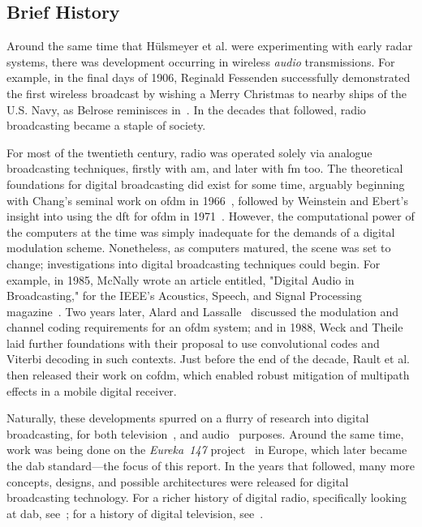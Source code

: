 \documentclass[class=report,11pt,crop=false]{standalone}
\begin{document}
\subsection{Brief History}
Around the same time that H\"ulsmeyer et al. were experimenting with early radar systems, there was development occurring in wireless \emph{audio} transmissions. For example, in the final days of 1906, Reginald Fessenden successfully demonstrated the first wireless broadcast by wishing a Merry Christmas to nearby ships of the U.S. Navy, as Belrose reminisces in~\cite{Belrose2012}. In the decades that followed, radio broadcasting became a staple of society.

For most of the twentieth century, radio was operated solely via analogue broadcasting techniques, firstly with \gls{am}, and later with \gls{fm} too. The theoretical foundations for digital broadcasting did exist for some time, arguably beginning with Chang's seminal work on \gls{ofdm} in 1966~\cite{Chang1966}, followed by Weinstein and Ebert's insight into using the \gls{dft} for \gls{ofdm} in 1971~\cite{Weinstein1971}. However, the computational power of the computers at the time was simply inadequate for the demands of a digital modulation scheme. Nonetheless, as computers matured, the scene was set to change; investigations into digital broadcasting techniques could begin. For example, in 1985, McNally wrote an article entitled, "Digital Audio in Broadcasting," for the IEEE's Acoustics, Speech, and Signal Processing magazine~\cite{McNally1985}. Two years later, Alard and Lassalle~\cite{lassalle1987principles, Alard1988} discussed the modulation and channel coding requirements for an \gls{ofdm} system; and in 1988, Weck and Theile~\cite{weck1988dab} laid further foundations with their proposal to use convolutional codes and Viterbi decoding in such contexts. Just before the end of the decade, Rault et al.~\cite{Raulta} then released their work on \gls{cofdm}, which enabled robust mitigation of multipath effects in a mobile digital receiver.

Naturally, these developments spurred on a flurry of research into digital broadcasting, for both television~\cite{Bernard1992, stare1992}, and audio~\cite{shelswell1991, Price1992, Maddocks1992} purposes. Around the same time, work was being done on the \emph{Eureka~147} project~\cite{Halliera} in Europe, which later became the \gls{dab} standard---the focus of this report. In the years that followed, many more concepts, designs, and possible architectures were released for digital broadcasting technology. For a richer history of digital radio, specifically looking at \gls{dab}, see~\cite{ONeill2009}; for a history of digital television, see~\cite{Wu2006}.
\end{document}
